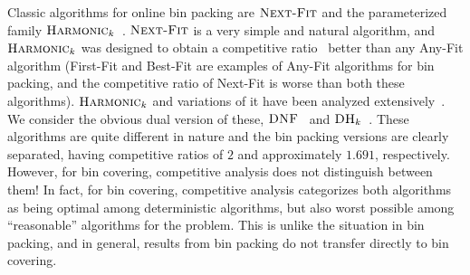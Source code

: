 \documentclass[11pt]{article}
\newcommand{\DNF}{\ensuremath{\operatorname{\textsc{DNF}}}\xspace}
\newcommand{\nextfit}{\ensuremath{\operatorname{\textsc{Next-Fit}}}\xspace}
\newcommand{\harm}{{\ensuremath{\textsc{Harmonic}_k}}\xspace}
\newcommand{\DHk}{{\ensuremath{\textsc{DH}_k}}\xspace}
\begin{document}
Classic algorithms for online bin packing are \nextfit and the
parameterized family \harm~\cite{HL85}.
\nextfit is a very simple and natural algorithm, and \harm was designed to
obtain a competitive ratio~\cite{ST85,KMRS88} better than any Any-Fit
algorithm (First-Fit and Best-Fit are examples of Any-Fit
algorithms for bin packing, and the competitive ratio of Next-Fit is
worse than both these algorithms).
\harm and variations of it have been analyzed extensively~\cite{RBLL89,W93,S02}.
We consider the obvious dual version of these,
\DNF~\cite{AJKL84j} and \DHk~\cite{CW98}.
These algorithms are quite different in nature
and the bin packing versions are clearly separated, 
having competitive ratios of $2$ and approximately $1.691$, respectively.
However, for bin covering,
competitive analysis does not distinguish between them!
In fact, for bin covering, competitive analysis categorizes both
algorithms as being optimal among deterministic algorithms, but also worst
possible among ``reasonable'' algorithms for the problem.
This is unlike the situation in bin packing, and in general, results
from bin packing do not transfer directly to bin covering.
\end{document}
